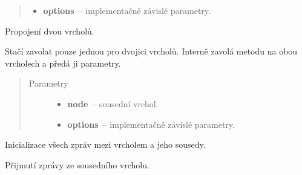 \begin{fulllineitems}
\begin{fulllineitems}
\begin{quote}
\begin{description}
\begin{itemize}
\item {} 
\textbf{options}~-- implementačně závislé parametry.

\end{itemize}

\end{description}\end{quote}

\end{fulllineitems}


\begin{fulllineitems}
\label{alex.infer:alex.infer.factor.alex.infer.node.Node.connect}
Propojení dvou vrcholů.

Stačí zavolat pouze jednou pro dvojici vrcholů.
Interně zavolá metodu {\hyperref[alex.infer:alex.infer.factor.alex.infer.node.Node.add_neighbor]{}} na obou vrcholech a předá ji parametry.
\begin{quote}\begin{description}
\item[{Parametry}] \leavevmode\begin{itemize}
\item {} 
\textbf{node}~-- sousední vrchol.

\item {} 
\textbf{options}~-- implementačně závislé parametry.

\end{itemize}

\end{description}\end{quote}

\end{fulllineitems}


\begin{fulllineitems}
\label{alex.infer:alex.infer.factor.alex.infer.node.Node.init_messages}
Inicializace všech zpráv mezi vrcholem a jeho sousedy.

\end{fulllineitems}


\begin{fulllineitems}
\label{alex.infer:alex.infer.factor.alex.infer.node.Node.message_from}
Přijmutí zprávy ze sousedního vrcholu.


\end{fulllineitems}
\end{fulllineitems}
